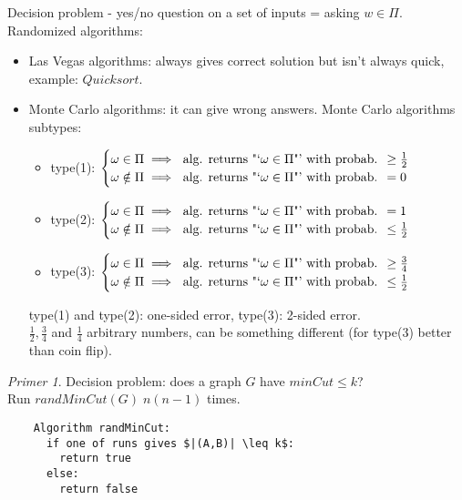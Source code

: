 \documentclass[a4paper, 12pt]{book}
\theoremstyle{definition}
\theoremstyle{remark}
\newtheorem*{ex}{Primer}
\begin{document}
Decision problem - yes/no question on a set of inputs = asking $w \in \Pi$. \\
Randomized algorithms:
\begin{itemize}
  \item Las Vegas algorithms: always gives correct solution but isn't always quick, example: $Quicksort$.
  \item Monte Carlo algorithms: it can give wrong answers.
    Monte Carlo algorithms subtypes:
    \begin{itemize}
      \item type(1): $\begin{cases}
          \omega \in \Pi \implies \text{ alg. returns "`$\omega \in \Pi$"' with probab. } \geq \frac{1}{2} \\ 
          \omega \notin \Pi \implies \text{ alg. returns "`$\omega \in \Pi$"' with probab. } = 0 
        \end{cases}$
      \item type(2): $\begin{cases}
          \omega \in \Pi \implies \text{ alg. returns "`$\omega \in \Pi$"' with probab. } = 1 \\ 
          \omega \notin \Pi \implies \text{ alg. returns "`$\omega \in \Pi$"' with probab. } \leq \frac{1}{2} 
        \end{cases}$
      \item type(3): $\begin{cases}
          \omega \in \Pi \implies \text{ alg. returns "`$\omega \in \Pi$"' with probab. } \geq \frac{3}{4} \\ 
          \omega \notin \Pi \implies \text{ alg. returns "`$\omega \in \Pi$"' with probab. } \leq \frac{1}{2}
        \end{cases}$
    \end{itemize}
    type(1) and type(2): one-sided error, type(3): 2-sided error. \\
    $\frac{1}{2}, \frac{3}{4}$ and $\frac{1}{4}$ arbitrary numbers, can be something different (for type(3) better than coin flip).
\end{itemize}
\begin{ex}
  Decision problem: does a graph $G$ have $minCut \leq k$? \\
  Run $randMinCut(G) \; n(n-1)$ times.
  \begin{lstlisting}
    Algorithm randMinCut:
      if one of runs gives $|(A,B)| \leq k$:
        return true
      else:
        return false
  \end{lstlisting}
\end{ex}
\end{document}

